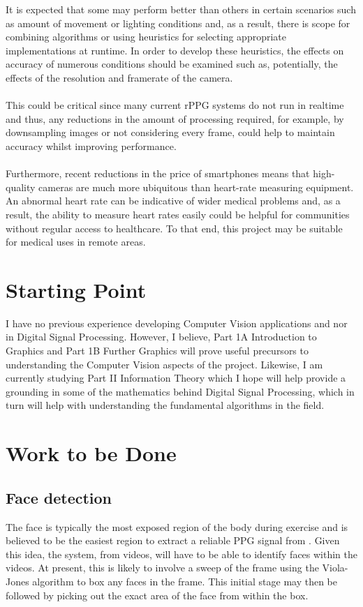 \documentclass{article}
\begin{document}
It is expected that some may perform better than others in certain scenarios such as amount of movement or lighting conditions and, as a result, there is scope for combining algorithms or using heuristics for selecting appropriate implementations at runtime. In order to develop these heuristics, the effects on accuracy of numerous conditions should be examined such as, potentially, the effects of the resolution and framerate of the camera. \\ \\
This could be critical since many current rPPG systems do not run in realtime and thus, any reductions in the amount of processing required, for example, by downsampling images or not considering every frame, could help to maintain accuracy whilst improving performance. \\\\
Furthermore, recent reductions in the price of smartphones means that high-quality cameras are much more ubiquitous than heart-rate measuring equipment. An abnormal heart rate can be indicative of wider medical problems and, as a result, the ability to measure heart rates easily could be helpful for communities without regular access to healthcare. To that end, this project may be suitable for medical uses in remote areas.

\section*{Starting Point}
I have no previous experience developing Computer Vision applications and nor in Digital Signal Processing. However, I believe, Part 1A Introduction to Graphics and Part 1B Further Graphics will prove useful precursors to understanding the Computer Vision aspects of the project. Likewise, I am currently studying Part II Information Theory which I hope will help provide a grounding in some of the mathematics behind Digital Signal Processing, which in turn will help with understanding the fundamental algorithms in the field.

\section*{Work to be Done}
\subsection*{Face detection}
The face is typically the most exposed region of the body during exercise and is believed to be the easiest region to extract a reliable PPG signal from \cite{vanderKooij2019}. Given this idea, the system, from videos, will have to be able to identify faces within the videos. At present, this is likely to involve a sweep of the frame using the Viola-Jones algorithm to box any faces in the frame. This initial stage may then be followed by picking out the exact area of the face from within the box.
\end{document}

